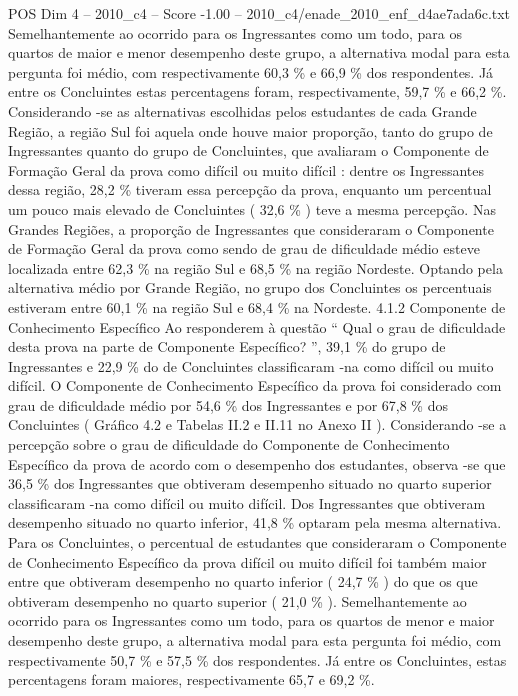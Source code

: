 \begin{textsample}{POS Dim 4 – 2010\_c4 – Score -1.00 – 2010\_c4/enade\_2010\_enf\_d4ae7ada6c.txt}
Semelhantemente ao ocorrido para os Ingressantes como um todo, para os quartos de maior e menor desempenho deste grupo, a alternativa modal para esta pergunta foi médio, com respectivamente 60,3 \% e 66,9 \% dos respondentes.
Já entre os Concluintes estas percentagens foram, respectivamente, 59,7 \% e 66,2 \%.
Considerando -se as alternativas escolhidas pelos estudantes de cada Grande Região, a região Sul foi aquela onde houve maior proporção, tanto do grupo de Ingressantes quanto do grupo de Concluintes, que avaliaram o Componente de Formação Geral da prova como difícil ou muito difícil : dentre os Ingressantes dessa região, 28,2 \% tiveram essa percepção da prova, enquanto um percentual um pouco mais elevado de Concluintes ( 32,6 \% ) teve a mesma percepção.
Nas Grandes Regiões, a proporção de Ingressantes que consideraram o Componente de Formação Geral da prova como sendo de grau de dificuldade médio esteve localizada entre 62,3 \% na região Sul e 68,5 \% na região Nordeste.
Optando pela alternativa médio por Grande Região, no grupo dos Concluintes os percentuais estiveram entre 60,1 \% na região Sul e 68,4 \% na Nordeste. 4.1.2 Componente de Conhecimento Específico Ao responderem à questão “ Qual o grau de dificuldade desta prova na parte de Componente Específico? ”, 39,1 \% do grupo de Ingressantes e 22,9 \% do de Concluintes classificaram -na como difícil ou muito difícil.
O Componente de Conhecimento Específico da prova foi considerado com grau de dificuldade médio por 54,6 \% dos Ingressantes e por 67,8 \% dos Concluintes ( Gráfico 4.2 e Tabelas II.2 e II.11 no Anexo II ).
Considerando -se a percepção sobre o grau de dificuldade do Componente de Conhecimento Específico da prova de acordo com o desempenho dos estudantes, observa -se que 36,5 \% dos Ingressantes que obtiveram desempenho situado no quarto superior classificaram -na como difícil ou muito difícil.
Dos Ingressantes que obtiveram desempenho situado no quarto inferior, 41,8 \% optaram pela mesma alternativa.
Para os Concluintes, o percentual de estudantes que consideraram o Componente de Conhecimento Específico da prova difícil ou muito difícil foi também maior entre que obtiveram desempenho no quarto inferior ( 24,7 \% ) do que os que obtiveram desempenho no quarto superior ( 21,0 \% ).
Semelhantemente ao ocorrido para os Ingressantes como um todo, para os quartos de menor e maior desempenho deste grupo, a alternativa modal para esta pergunta foi médio, com respectivamente 50,7 \% e 57,5 \% dos respondentes.
Já entre os Concluintes, estas percentagens foram maiores, respectivamente 65,7 e 69,2 \%.

\end{textsample}
